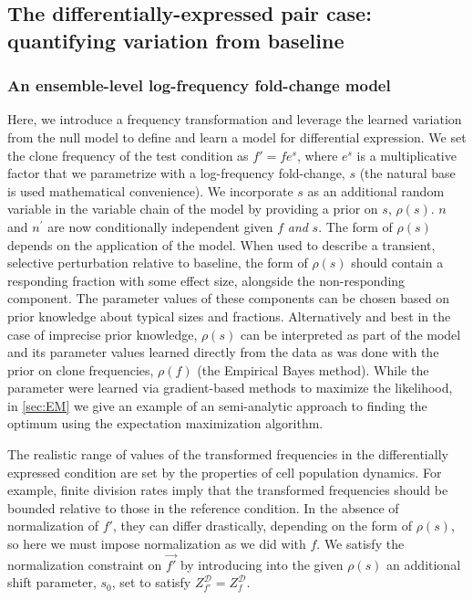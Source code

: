 \documentclass[letterpaper,english,prl,reprint,longbibliography]{revtex4-1} %
\begin{document}
\subsection{The differentially-expressed pair case: quantifying variation from baseline} \label{sec:diffexpr}

\subsubsection*{An ensemble-level log-frequency fold-change model}

Here, we introduce a frequency transformation and leverage the learned variation from the null model to define and learn a model for differential expression. 
We set the clone frequency of the test condition as $f'=fe^s$, where $e^s$ is a multiplicative factor that we parametrize with a log-frequency fold-change, $s$ (the natural base is used mathematical convenience). 
We incorporate $s$ as an additional random variable in the variable chain of the model by providing a prior on $s$, $\rho(s)$. 
$n$ and $n^{\prime}$ are now conditionally independent given $f$ \textit{and} $s$.
The form of $\rho(s)$ depends on the application of the model. 
When used to describe a transient, selective perturbation relative to baseline, the form of $\rho(s)$ should contain a responding fraction with some effect size, alongside the non-responding component. 
The parameter values of these components can be chosen based on prior knowledge about typical sizes and fractions. 
Alternatively and best in the case of imprecise prior knowledge, $\rho(s)$ can be interpreted as part of the model and its parameter values learned directly from the data as was done with the prior on clone frequencies, $\rho(f)$ (the Empirical Bayes method). 
While the parameter were learned via gradient-based methods to maximize the likelihood, in \cref{sec:EM} we give an example of an semi-analytic approach to finding the optimum using the expectation maximization algorithm. 

The realistic range of values of the transformed frequencies in the differentially expressed condition are set by the properties of cell population dynamics.  For example, finite division rates imply that the transformed frequencies should be bounded relative to those in the reference condition.
In the absence of normalization of $f'$, they can differ drastically, depending on the form of $\rho(s)$, so here we must impose normalization as we did with $f$. We satisfy the normalization constraint on $\vec{f'}$ by introducing into the given $\rho(s)$ an additional shift parameter, $s_0$, set to satisfy  $Z^\mathcal{D}_{f'}=Z^\mathcal{D}_f$.
\end{document}
